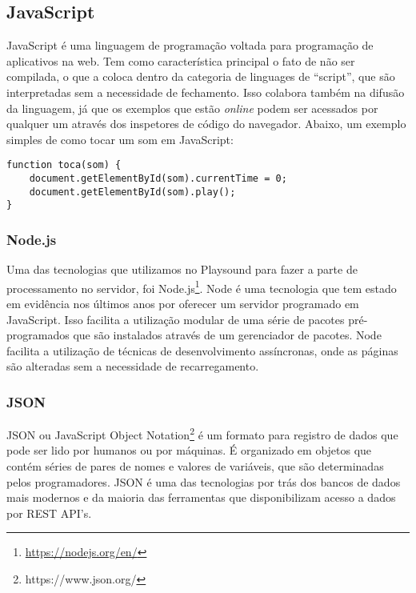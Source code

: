 \subsection{JavaScript}
JavaScript é uma linguagem de programação voltada para programação de aplicativos na web. Tem como característica principal o fato de não ser compilada, o que a coloca dentro da categoria de linguages de ``script'', que são interpretadas sem a necessidade de fechamento. Isso colabora também na difusão da linguagem, já que os exemplos que estão \emph{online} podem ser acessados por qualquer um através dos inspetores de código do navegador. Abaixo, um exemplo simples de como tocar um som em JavaScript: 

\begin{verbatim}
function toca(som) {
    document.getElementById(som).currentTime = 0;
    document.getElementById(som).play();
}
\end{verbatim}

\subsubsection{Node.js}
Uma das tecnologias que utilizamos no Playsound para fazer a parte de processamento no servidor, foi Node.js\footnote{\url{https://nodejs.org/en/}}. Node é uma tecnologia que tem estado em evidência nos últimos anos por oferecer um servidor programado em JavaScript. Isso facilita a utilização modular de uma série de pacotes pré-programados que são instalados através de um gerenciador de pacotes. Node facilita a utilização de técnicas de desenvolvimento assíncronas, onde as páginas são alteradas sem a necessidade de recarregamento. 


\subsubsection{JSON}
JSON ou JavaScript Object Notation\footnote{https://www.json.org/} é um formato para registro de dados que pode ser lido por humanos ou por máquinas. É organizado em objetos que contém séries de pares de nomes e valores de variáveis, que são determinadas pelos programadores. JSON é uma das tecnologias por trás dos bancos de dados mais modernos e da maioria das ferramentas que disponibilizam acesso a dados por REST API's.


